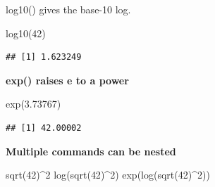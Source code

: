 \documentclass[
]{book}
\newenvironment{Shaded}{\begin{snugshade}}{\end{snugshade}}
\newcommand{\DecValTok}[1]{\textcolor[rgb]{0.00,0.00,0.81}{#1}}
\newcommand{\FloatTok}[1]{\textcolor[rgb]{0.00,0.00,0.81}{#1}}
\newcommand{\FunctionTok}[1]{\textcolor[rgb]{0.00,0.00,0.00}{#1}}
\newcommand{\NormalTok}[1]{#1}
\newcommand{\SpecialCharTok}[1]{\textcolor[rgb]{0.00,0.00,0.00}{#1}}
\begin{document}
log10() gives the base-10 log.

\begin{Shaded}
\begin{Highlighting}[]
\FunctionTok{log10}\NormalTok{(}\DecValTok{42}\NormalTok{)}
\end{Highlighting}
\end{Shaded}

\begin{verbatim}
## [1] 1.623249
\end{verbatim}

\textbf{exp() raises e to a power}

\begin{Shaded}
\begin{Highlighting}[]
\FunctionTok{exp}\NormalTok{(}\FloatTok{3.73767}\NormalTok{)}
\end{Highlighting}
\end{Shaded}

\begin{verbatim}
## [1] 42.00002
\end{verbatim}

\textbf{Multiple commands can be nested}

\begin{Shaded}
\begin{Highlighting}[]
\FunctionTok{sqrt}\NormalTok{(}\DecValTok{42}\NormalTok{)}\SpecialCharTok{\^{}}\DecValTok{2}
\FunctionTok{log}\NormalTok{(}\FunctionTok{sqrt}\NormalTok{(}\DecValTok{42}\NormalTok{)}\SpecialCharTok{\^{}}\DecValTok{2}\NormalTok{)}
\FunctionTok{exp}\NormalTok{(}\FunctionTok{log}\NormalTok{(}\FunctionTok{sqrt}\NormalTok{(}\DecValTok{42}\NormalTok{)}\SpecialCharTok{\^{}}\DecValTok{2}\NormalTok{))}
\end{Highlighting}
\end{Shaded}


  
\end{document}
